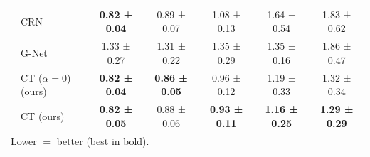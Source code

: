 \begin{tabular}{ll|ccccc}
           & CRN &  \textbf{0.82 ± 0.04} &           0.89 ± 0.07 &           1.08 ± 0.13 &           1.64 ± 0.54 &           1.83 ± 0.62 \\
\vspace{0.9mm}
           & G-Net &           1.33 ± 0.27 &           1.31 ± 0.22 &           1.35 ± 0.29 &           1.35 ± 0.16 &           1.86 ± 0.47 \\
           & CT ($\alpha = 0$) (ours) &  \textbf{0.82 ± 0.04} &  \textbf{0.86 ± 0.05} &           0.96 ± 0.12 &           1.19 ± 0.33 &           1.32 ± 0.34 \\
           & CT (ours) &  \textbf{0.82 ± 0.05} &           0.88 ± 0.06 &  \textbf{0.93 ± 0.11} &  \textbf{1.16 ± 0.25} &  \textbf{1.29 ± 0.29} \\
\bottomrule
\multicolumn{7}{l}{Lower $=$ better (best in bold). }
\end{tabular}
